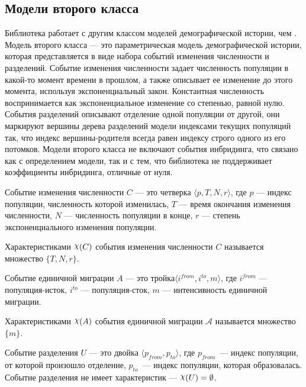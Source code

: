 \subsection{Модели второго класса}
\label{sec:part1:modeling:models_2}
Библиотека \momi работает с другим классом моделей демографической истории, чем \dadi.
Модель второго класса --- это параметрическая модель демографической истории, которая представляется в виде набора событий изменения численности и разделений.
Событие изменения численности задает численность популяции в какой-то момент времени в прошлом, а также описывает ее изменение до этого момента, используя экспоненциальный закон.
Константная численность воспринимается как экспоненциальное изменение со степенью, равной нулю.
События разделений описывают отделение одной популяции от другой, они маркируют вершины дерева разделений модели индексами текущих популяций так, что индекс вершины-родителя всегда равен индексу строго одного из его потомков.
Модели второго класса не включают события инбридинга, что связано как с определением модели, так и с тем, что библиотека \momi не поддерживает коэффициенты инбридинга, отличные от нуля.


 Событие изменения численности $C$ --- это четверка ${\langle p, T, N, r\rangle}$, где $p$ --- индекс популяции, численность которой изменилась, $T$ --- время окончания изменения численности, $N$ --- численность популяции в конце, $r$ --- степень экспоненциального изменения популяции.

 Характеристиками $\rchi(C)$ события изменения численности $C$ называется множество $\{T, N, r\}$.

 Событие единичной миграции $A$ --- это тройка\linebreak ${\langle i^{from}, i^{to}, m \rangle}$, где $i^{from}$ --- популяция-исток, $i^{to}$ --- популяция-сток, $m$ --- интенсивность единичной миграции.

 Характеристиками $\rchi(A)$ события единичной миграции $\mathcal{A}$ называется множество
$\{m\}$.

 Событие разделения $U$ --- это двойка ${\langle p_{from}, p_{to}\rangle}$, где $p_{from}$~--- индекс популяции, от которой произошло отделение, $p_{to}$~--- индекс популяции, которая образовалась.
Событие разделения не имеет характеристик --- $\rchi(U) = \emptyset$.

